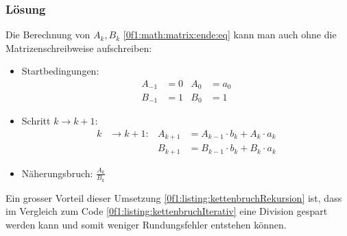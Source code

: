 \subsubsection{Lösung}
Die Berechnung von $A_k, B_k$ \eqref{0f1:math:matrix:ende:eq} kann man auch ohne die Matrizenschreibweise aufschreiben: \cite{0f1:wiki-fraction}
\begin{itemize}
\item Startbedingungen:
\begin{align*}
A_{-1} &= 0		&		A_0 &= a_0 \\
B_{-1} &= 1		&		B_0 &= 1 
\end{align*}
\item Schritt $k\to k+1$:
\[
\begin{aligned}
k &\rightarrow k + 1:
&
A_{k+1} &= A_{k-1} \cdot b_k + A_k \cdot a_k \\
&&
B_{k+1} &= B_{k-1} \cdot b_k + B_k \cdot a_k
\end{aligned}
\]
\item
Näherungsbruch: \qquad$\displaystyle\frac{A_k}{B_k}$
\end{itemize}

Ein grosser Vorteil dieser Umsetzung \ref{0f1:listing:kettenbruchRekursion} ist, dass im Vergleich zum Code \ref{0f1:listing:kettenbruchIterativ} eine Division gespart werden kann und somit weniger Rundungsfehler entstehen können.

